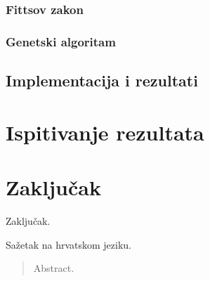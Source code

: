 \documentclass[times, utf8, zavrsni]{fer}
\begin{document}
\subsection{Fittsov zakon}

\subsection{Genetski algoritam}

\section{Implementacija i rezultati}

\chapter{Ispitivanje rezultata}

\chapter{Zaključak}
Zaključak.




\begin{sazetak}
Sažetak na hrvatskom jeziku.

\end{sazetak}

\begin{abstract}
Abstract.	

\end{abstract}
\end{document}

